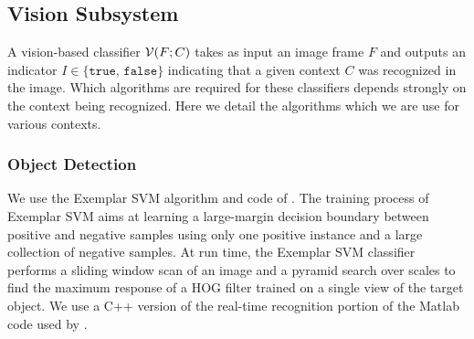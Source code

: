 \documentclass{llncs}
\begin{document}


\subsection{Vision Subsystem}
A vision-based classifier ${\cal V}(F;C)$ takes as input an image
frame $F$ and outputs an indicator $I\in\{\texttt{true, false}\}$ indicating
that a given context $C$ was recognized in the image. Which algorithms
are required for these classifiers depends strongly on the context
being recognized.  Here we detail the algorithms which we are use for various contexts.

\subsubsection{Object Detection}
We use the Exemplar SVM algorithm and code of \citet{exemplarsvm}.  The training
process of Exemplar SVM aims at learning a large-margin decision
boundary between positive and negative samples using only one positive
instance and a large collection of negative samples. At run time, the
Exemplar SVM classifier performs a sliding window scan of an image and
a pyramid search over scales to find the maximum response of a HOG
filter trained on a single view of the target object. We use a C++ version of the real-time recognition portion of the Matlab code
used by \citet{exemplarsvm}.
\end{document}
